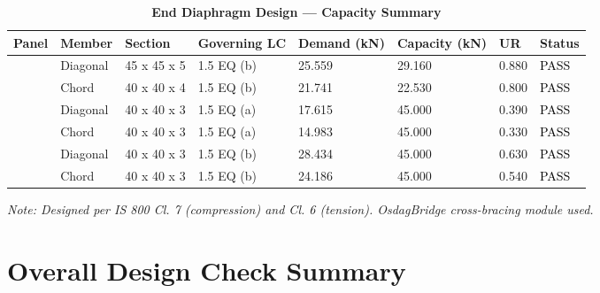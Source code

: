 \documentclass[12pt,a4paper]{report}
\numberwithin{table}{chapter}
\numberwithin{figure}{chapter}
\begin{document}
\vspace{1em}

\begin{longtable}{|C{2.0cm}|L{1.8cm}|C{2.2cm}|C{3.0cm}|C{1.8cm}|C{1.8cm}|C{1.2cm}|C{1.8cm}|}
\caption{\textbf{End Diaphragm Design --- Capacity Summary}}
\hline
\textbf{Panel} & \textbf{Member} & \textbf{Section} & \textbf{Governing LC} & \textbf{Demand (kN)} & \textbf{Capacity (kN)} & \textbf{UR} & \textbf{Status} \\[6pt]
\hline
{} & Diagonal & 45 x 45 x 5 & 1.5 EQ (b) & 25.559 & 29.160 & 0.880 & \textcolor{black}{PASS} \\[6pt]
 & Chord & 40 x 40 x 4 & 1.5 EQ (b) & 21.741 & 22.530 & 0.800 & \textcolor{black}{PASS} \\[6pt]
\hline
{} & Diagonal & 40 x 40 x 3 & 1.5 EQ (a) & 17.615 & 45.000 & 0.390 & \textcolor{black}{PASS} \\[6pt]
 & Chord & 40 x 40 x 3 & 1.5 EQ (a) & 14.983 & 45.000 & 0.330 & \textcolor{black}{PASS} \\[6pt]
\hline
{} & Diagonal & 40 x 40 x 3 & 1.5 EQ (b) & 28.434 & 45.000 & 0.630 & \textcolor{black}{PASS} \\[6pt]
 & Chord & 40 x 40 x 3 & 1.5 EQ (b) & 24.186 & 45.000 & 0.540 & \textcolor{black}{PASS} \\[6pt]
\hline
\end{longtable}
\noindent\textit{Note: Designed per IS 800 Cl. 7 (compression) and Cl. 6 (tension). OsdagBridge cross-bracing module used.}

\section{Overall Design Check Summary}
\label{sec:overall-summary}
\end{document}
